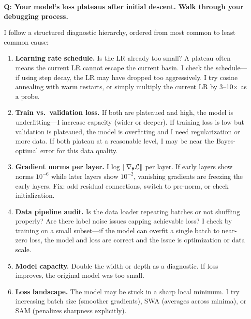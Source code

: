 \begin{interviewq}
\textbf{Q: Your model's loss plateaus after initial descent. Walk through your debugging process.}

 \quad {} \quad \badgefreq{\freqhigh}

\stronganswer

I follow a structured diagnostic hierarchy, ordered from most common to least common cause:

\begin{enumerate}
    \item \textbf{Learning rate schedule.} Is the LR already too small? A plateau often means the current LR cannot escape the current basin. I check the schedule---if using step decay, the LR may have dropped too aggressively. I try cosine annealing with warm restarts, or simply multiply the current LR by 3--10$\times$ as a probe.

    \item \textbf{Train vs.\ validation loss.} If both are plateaued and high, the model is underfitting---I increase capacity (wider or deeper). If training loss is low but validation is plateaued, the model is overfitting and I need regularization or more data. If both plateau at a reasonable level, I may be near the Bayes-optimal error for this data quality.

    \item \textbf{Gradient norms per layer.} I log $\|\nabla_\theta \mathcal{L}\|$ per layer. If early layers show norms $10^{-6}$ while later layers show $10^{-2}$, vanishing gradients are freezing the early layers. Fix: add residual connections, switch to pre-norm, or check initialization.

    \item \textbf{Data pipeline audit.} Is the data loader repeating batches or not shuffling properly? Are there label noise issues capping achievable loss? I check by training on a small subset---if the model can overfit a single batch to near-zero loss, the model and loss are correct and the issue is optimization or data scale.

    \item \textbf{Model capacity.} Double the width or depth as a diagnostic. If loss improves, the original model was too small.

    \item \textbf{Loss landscape.} The model may be stuck in a sharp local minimum. I try increasing batch size (smoother gradients), SWA (averages across minima), or SAM (penalizes sharpness explicitly).
\end{enumerate}


\end{interviewq}
